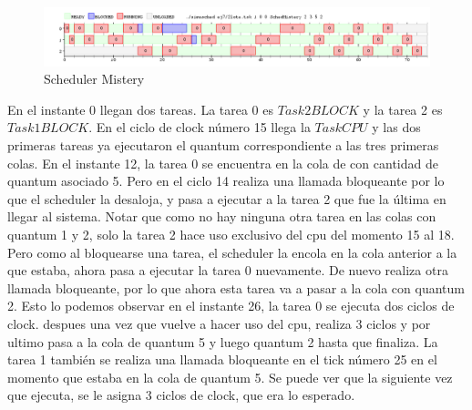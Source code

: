 \begin{figure}[H]
  \centering
    \includegraphics[width=1\textwidth]{../ej7/todojuntomistery.png}
    \caption{Scheduler Mistery}
\end{figure}


En el instante 0 llegan dos tareas. La tarea 0 es $Task2BLOCK$ y la tarea 2 es $Task1BLOCK$. En el ciclo de clock número 15 llega la $TaskCPU$ y
las dos primeras tareas ya ejecutaron el quantum correspondiente a las tres primeras colas. En el instante 12, la tarea 0 se encuentra en la cola de con 
cantidad de quantum asociado 5. Pero en el ciclo 14 realiza una llamada bloqueante por lo que el scheduler la desaloja, y pasa a ejecutar a la tarea 2 que fue la 
última en llegar al sistema. Notar que como no hay ninguna otra tarea en las colas con quantum 1 y 2, solo la tarea 2 hace uso exclusivo del cpu 
del momento 15 al 18. Pero como al bloquearse una tarea, el scheduler la encola en la cola anterior a la que estaba, ahora pasa a ejecutar la tarea 0 nuevamente.
De nuevo realiza otra llamada bloqueante, por lo que ahora esta tarea va a pasar a la cola con quantum 2. Esto lo podemos observar en el instante 26, la tarea 0 
se ejecuta dos ciclos de clock. despues una vez que vuelve a hacer uso del cpu, realiza 3 ciclos y por ultimo pasa a la cola de quantum 5 y luego quantum 2 hasta que finaliza.
La tarea 1 también se realiza una llamada bloqueante en el tick número 25 en el momento que estaba en la cola de quantum 5. Se puede ver que la siguiente vez que 
ejecuta, se le asigna 3 ciclos de clock, que era lo esperado. 





